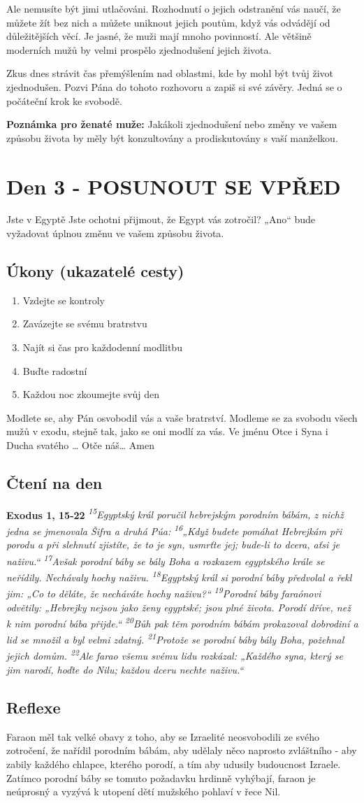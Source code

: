 \documentclass[11pt]{article}
\newcommand{\zacatekPrvniTyden}{
  Jste v Egyptě \newline
  Jste ochotni přijmout, že Egypt vás zotročil? „Ano“ bude vyžadovat úplnou změnu ve vašem způsobu života.

\subsection*{Úkony (ukazatelé cesty)}
\begin{enumerate}
  \item Vzdejte se kontroly
  \item Zavázejte se svému bratrstvu
  \item Najít si čas pro každodenní modlitbu
  \item Buďte radostní
  \item Každou noc zkoumejte svůj den
\end{enumerate}
Modlete se, aby Pán osvobodil vás a vaše bratrství. \newline
Modleme se za svobodu všech mužů v exodu, stejně tak, jako se oni modlí za vás.\newline
Ve jménu Otce i Syna i Ducha svatého …  Otče náš… Amen
}
\begin{document}
Ale nemusíte být jimi utlačováni. Rozhodnutí o jejich odstranění vás naučí, že můžete žít bez nich a můžete uniknout jejich poutům, když vás odvádějí od důležitějších věcí.
Je jasné, že muži mají mnoho povinností. Ale většině moderních mužů by velmi prospělo zjednodušení jejich života.

Zkus dnes strávit čas přemýšlením nad oblastmi, kde by mohl být tvůj život zjednodušen. Pozvi Pána do tohoto rozhovoru a zapiš si své závěry. Jedná se o počáteční krok ke svobodě.

\textbf{Poznámka pro ženaté muže:} Jakákoli zjednodušení nebo změny ve vašem způsobu života by měly být konzultovány a prodiskutovány s vaší manželkou.

\newpage
\section{Den 3 - POSUNOUT SE VPŘED }
\zacatekPrvniTyden
\subsection*{Čtení na den}
\textbf{Exodus 1, 15-22}
\newline
\textit{
\textsuperscript{15}Egyptský král poručil hebrejským porodním bábám, z nichž jedna se jmenovala Šifra a druhá Púa:
\textsuperscript{16}„Když budete pomáhat Hebrejkám při porodu a při slehnutí zjistíte, že to je syn, usmrťte jej; bude-li to dcera, aťsi je naživu.“
\textsuperscript{17}Avšak porodní báby se bály Boha a rozkazem egyptského krále se neřídily. Nechávaly hochy naživu.
\textsuperscript{18}Egyptský král si porodní báby předvolal a řekl jim: „Co to děláte, že necháváte hochy naživu?“
\textsuperscript{19}Porodní báby faraónovi odvětily: „Hebrejky nejsou jako ženy egyptské; jsou plné života. Porodí dříve, než k nim porodní bába přijde.“
\textsuperscript{20}Bůh pak těm porodním bábám prokazoval dobrodiní a lid se množil a byl velmi zdatný.
\textsuperscript{21}Protože se porodní báby bály Boha, požehnal jejich domům.
\textsuperscript{22}Ale farao všemu svému lidu rozkázal: „Každého syna, který se jim narodí, hoďte do Nilu; každou dceru nechte naživu.“
}

\subsection*{Reflexe}

Faraon měl tak velké obavy z toho, aby se Izraelité neosvobodili ze svého zotročení, že nařídil porodním bábám, aby udělaly něco naprosto zvláštního - aby zabily každého chlapce, kterého porodí, a tím aby udusily budoucnost Izraele. Zatímco porodní báby se tomuto požadavku hrdinně vyhýbají, faraon je neúprosný a vyzývá k utopení dětí mužského pohlaví v řece Nil.
\end{document}

